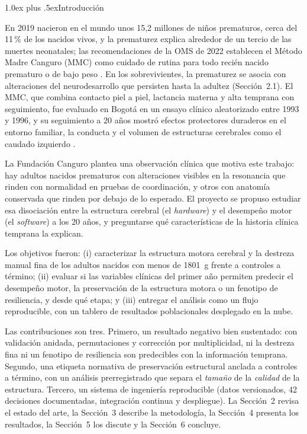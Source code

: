 \documentclass[conference,letterpaper,10pt]{IEEEtran}
\makeatletter
\def\section{\@startsection{section}{1}{\z@}{2.0ex plus 1ex minus .5ex}%
  {1.0ex plus .5ex}{\normalfont\normalsize\bfseries}}
\makeatother
\begin{document}
\section{Introducción}

En 2019 nacieron en el mundo unos 15,2 millones de niños prematuros, cerca del 11\,\% de los nacidos vivos, y la prematurez explica alrededor de un tercio de las muertes neonatales; las recomendaciones de la OMS de 2022 establecen el Método Madre Canguro (MMC) como cuidado de rutina para todo recién nacido prematuro o de bajo peso \cite{darmstadt2023}. En los sobrevivientes, la prematurez se asocia con alteraciones del neurodesarrollo que persisten hasta la adultez (Sección~2.1). El MMC, que combina contacto piel a piel, lactancia materna y alta temprana con seguimiento, fue evaluado en Bogotá en un ensayo clínico aleatorizado entre 1993 y 1996, y su seguimiento a 20 años mostró efectos protectores duraderos en el entorno familiar, la conducta y el volumen de estructuras cerebrales como el caudado izquierdo \cite{charpak2017,charpak2022}.

La Fundación Canguro plantea una observación clínica que motiva este trabajo: hay adultos nacidos prematuros con alteraciones visibles en la resonancia que rinden con normalidad en pruebas de coordinación, y otros con anatomía conservada que rinden por debajo de lo esperado. El proyecto se propuso estudiar esa disociación entre la estructura cerebral (el \emph{hardware}) y el desempeño motor (el \emph{software}) a los 20 años, y preguntarse qué características de la historia clínica temprana la explican.

Los objetivos fueron: (i) caracterizar la estructura motora cerebral y la destreza manual fina de los adultos nacidos con menos de 1801~g frente a controles a término; (ii) evaluar si las variables clínicas del primer año permiten predecir el desempeño motor, la preservación de la estructura motora o un fenotipo de resiliencia, y desde qué etapa; y (iii) entregar el análisis como un flujo reproducible, con un tablero de resultados poblacionales desplegado en la nube.

Las contribuciones son tres. Primero, un resultado negativo bien sustentado: con validación anidada, permutaciones y corrección por multiplicidad, ni la destreza fina ni un fenotipo de resiliencia son predecibles con la información temprana. Segundo, una etiqueta normativa de preservación estructural anclada a controles a término, con un análisis prerregistrado que separa el \emph{tamaño} de la \emph{calidad} de la estructura. Tercero, un sistema de ingeniería reproducible (datos versionados, 42 decisiones documentadas, integración continua y despliegue). La Sección~2 revisa el estado del arte, la Sección~3 describe la metodología, la Sección~4 presenta los resultados, la Sección~5 los discute y la Sección~6 concluye.
\end{document}
